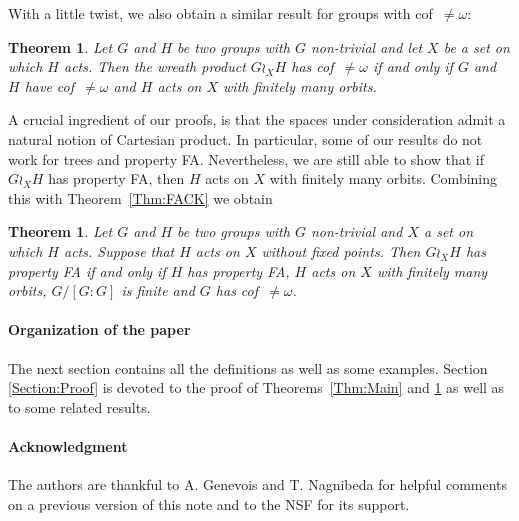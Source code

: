 \documentclass[a4paper]{article}
\newtheorem{thm}[lem]{Theorem}
\theoremstyle{definition}
\begin{document}
%
%
With a little twist, we also obtain a similar result for groups with cof~$\neq\omega$:
\begin{thm}\label{Thm:UncCoun}
Let $G$ and $H$ be two groups with $G$ non-trivial and let $X$ be a set on which $H$ acts. Then the wreath product $G \wr_X H$ has cof~$\neq\omega$ if and only if $G$ and $H$ have cof~$\neq\omega$ and $H$ acts on $X$ with finitely many orbits.
\end{thm}
%
%
A crucial ingredient of our proofs, is that the spaces under consideration admit a natural notion of Cartesian product.
In particular, some of our results do not work for trees and property FA.
Nevertheless, we are still able to show that if $G\wr_XH$ has property FA, then $H$ acts on $X$ with finitely many orbits. Combining this with Theorem~\ref{Thm:FACK} we obtain
\begin{thm}\label{Thm:FAFiniteOrbits}
Let $G$ and $H$ be two groups with $G$ non-trivial and $X$ a set on which $H$ acts. Suppose that $H$ acts on $X$ without fixed points.
Then $G\wr_XH$ has property FA if and only if $H$ has property FA, $H$ acts on $X$ with finitely many orbits, $G/[G:G]$ is finite and $G$ has cof~$\neq\omega$.
\end{thm}
%
%
%
%
\paragraph{Organization of the paper}
The next section contains all the definitions as well as some examples. Section \ref{Section:Proof} is devoted to the proof of Theorems~\ref{Thm:Main} and \ref{Thm:UncCoun} as well as to some related results.
%
%
%
\paragraph{Acknowledgment}
The authors are thankful to A. Genevois and T. Nagnibeda for helpful comments on a previous version of this note and to the NSF for its support.
%
%
%
\end{document}
